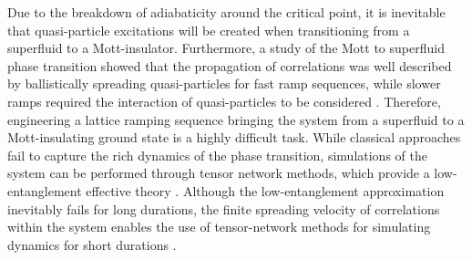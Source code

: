 Due to the breakdown of adiabaticity around the critical point, it is inevitable that quasi-particle excitations will be created when transitioning from a superfluid to a Mott-insulator. Furthermore, a study of the Mott to superfluid phase transition showed that the propagation of correlations was well described by ballistically spreading quasi-particles for fast ramp sequences, while slower ramps required the interaction of quasi-particles to be considered \cite{Braun2015}. Therefore, engineering a lattice ramping sequence bringing the system from a superfluid to a Mott-insulating ground state is a highly difficult task. While classical approaches fail to capture the rich dynamics of the phase transition, simulations of the system can be performed through tensor network methods, which provide a low-entanglement effective theory \cite{Gillman2018}. Although the low-entanglement approximation inevitably fails for long durations, the finite spreading velocity of correlations within the system enables the use of tensor-network methods for simulating dynamics for short durations \cite{Eisert2015}. 